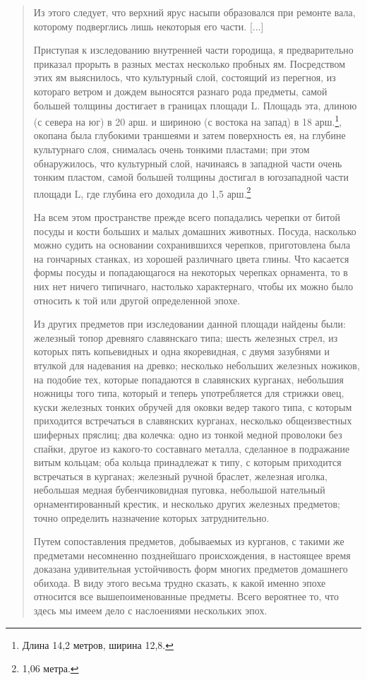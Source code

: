 \begin{quotation}
Из этого следует, что верхний ярус насыпи образовался при ремонте вала, которому подверглись лишь некоторыя его части. [...]

Приступая к изследованию внутренней части городища, я предварительно приказал прорыть в разных местах несколько пробных ям. Посредством этих ям выяснилось, что культурный слой, состоящий из перегноя, из котораго ветром и дождем выносятся разнаго рода предметы, самой большей толщины достигает в границах площади L. Площадь эта, длиною (с севера на юг) в 20 арш. и шириною (с востока на запад) в 18 арш.\footnote{Длина 14,2 метров, ширина 12,8.}, окопана была глубокими траншеями и затем поверхность ея, на глубине культурнаго слоя, снималась очень тонкими пластами; при этом обнаружилось, что культурный слой, начинаясь в западной части очень тонким пластом, самой большей толщины достигал в югозападной части площади L, где глубина его доходила до 1,5 арш.\footnote{1,06 метра.} 

На всем этом пространстве прежде всего попадались черепки от битой посуды и кости больших и малых домашних животных. Посуда, насколько можно судить на основании сохранившихся черепков, приготовлена была на гончарных станках, из хорошей различнаго цвета глины. Что касается формы посуды и попадающагося на некоторых черепках орнамента, то в них нет ничего типичнаго, настолько характернаго, чтобы их можно было относить к той или другой определенной эпохе.

Из других предметов при изследовании данной площади найдены были: железный топор древняго славянскаго типа; шесть железных стрел, из которых пять копьевидных и одна якоревидная, с двумя зазубнями и втулкой для надевания на древко; несколько небольших железных ножиков, на подобие тех, которые попадаются в славянских курганах, небольшия ножницы того типа, который и теперь употребляется для стрижки овец, куски железных тонких обручей для оковки ведер такого типа, с которым приходится встречаться в славянских курганах, несколько общеизвестных шиферных пряслиц; два колечка: одно из тонкой медной проволоки без спайки, другое из какого-то составнаго металла, сделанное в подражание витым кольцам; оба кольца принадлежат к типу, с которым приходится встречаться в курганах; железный ручной браслет, железная иголка, небольшая медная бубенчиковидная пуговка, небольшой нательный орнаментированный крестик, и несколько других железных предметов; точно определить назначение которых затруднительно.

Путем сопоставления предметов, добываемых из курганов, с такими же предметами несомненно позднейшаго происхождения, в настоящее время доказана удивительная устойчивость форм многих предметов домашнего обихода. В виду этого весьма трудно сказать, к какой именно эпохе относится все вышепоименованные предметы. Всего вероятнее то, что здесь мы имеем дело с наслоениями нескольких эпох.
\end{quotation}

